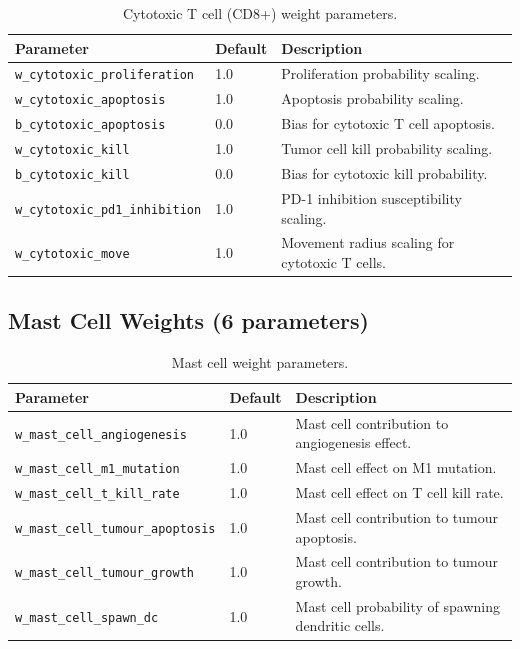 \begin{table}[H]
\centering
\caption{Cytotoxic T cell (CD8+) weight parameters.}
\label{tab:ctc-weights}
\begin{tabular}{@{}llp{5.5cm}@{}}
\toprule
\textbf{Parameter} & \textbf{Default} & \textbf{Description} \\
\midrule
\texttt{w\_cytotoxic\_proliferation} & 1.0 & Proliferation probability scaling. \\
\texttt{w\_cytotoxic\_apoptosis} & 1.0 & Apoptosis probability scaling. \\
\texttt{b\_cytotoxic\_apoptosis} & 0.0 & Bias for cytotoxic T cell apoptosis. \\
\texttt{w\_cytotoxic\_kill} & 1.0 & Tumor cell kill probability scaling. \\
\texttt{b\_cytotoxic\_kill} & 0.0 & Bias for cytotoxic kill probability. \\
\texttt{w\_cytotoxic\_pd1\_inhibition} & 1.0 & PD-1 inhibition susceptibility scaling. \\
\texttt{w\_cytotoxic\_move} & 1.0 & Movement radius scaling for cytotoxic T cells. \\
\bottomrule
\end{tabular}
\end{table}

\subsection{Mast Cell Weights (6 parameters)}

\begin{table}[H]
\centering
\caption{Mast cell weight parameters.}
\label{tab:mast-weights}
\begin{tabular}{@{}llp{5.5cm}@{}}
\toprule
\textbf{Parameter} & \textbf{Default} & \textbf{Description} \\
\midrule
\texttt{w\_mast\_cell\_angiogenesis} & 1.0 & Mast cell contribution to angiogenesis effect. \\
\texttt{w\_mast\_cell\_m1\_mutation} & 1.0 & Mast cell effect on M1 mutation. \\
\texttt{w\_mast\_cell\_t\_kill\_rate} & 1.0 & Mast cell effect on T cell kill rate. \\
\texttt{w\_mast\_cell\_tumour\_apoptosis} & 1.0 & Mast cell contribution to tumour apoptosis. \\
\texttt{w\_mast\_cell\_tumour\_growth} & 1.0 & Mast cell contribution to tumour growth. \\
\texttt{w\_mast\_cell\_spawn\_dc} & 1.0 & Mast cell probability of spawning dendritic cells. \\
\bottomrule
\end{tabular}
\end{table}

